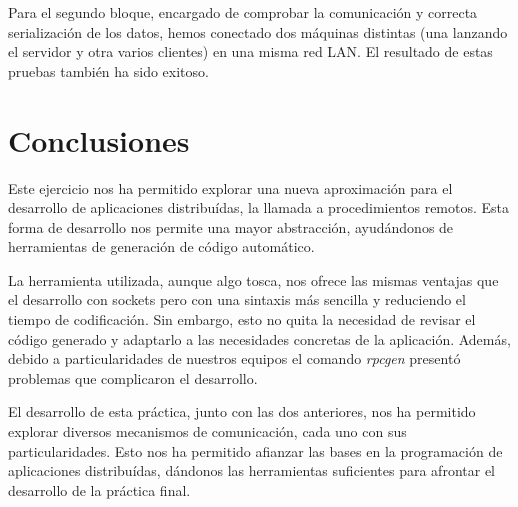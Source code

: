 \documentclass[]{article}
\begin{document}
Para el segundo bloque, encargado de comprobar la comunicación y correcta serialización de los datos, hemos conectado dos máquinas distintas (una lanzando el servidor y otra varios clientes) en una misma red LAN. El resultado de estas pruebas también ha sido exitoso.

\section{Conclusiones}
\label{sec:conclusiones}
Este ejercicio nos ha permitido explorar una nueva aproximación para el desarrollo de aplicaciones distribuídas, la llamada a procedimientos remotos. Esta forma de desarrollo nos permite una mayor abstracción, ayudándonos de herramientas de generación de código automático. 

La herramienta utilizada, aunque algo tosca, nos ofrece las mismas ventajas que el desarrollo con sockets pero con una sintaxis más sencilla y reduciendo el tiempo de codificación. Sin embargo, esto no quita la necesidad de revisar el código generado y adaptarlo a las necesidades concretas de la aplicación. Además, debido a particularidades de nuestros equipos el comando \textit{rpcgen} presentó problemas que complicaron el desarrollo. 

El desarrollo de esta práctica, junto con las dos anteriores, nos ha permitido explorar diversos mecanismos de comunicación, cada uno con sus particularidades. Esto nos ha permitido afianzar las bases en la programación de aplicaciones distribuídas, dándonos las herramientas suficientes para afrontar el desarrollo de la práctica final. 
\end{document}

